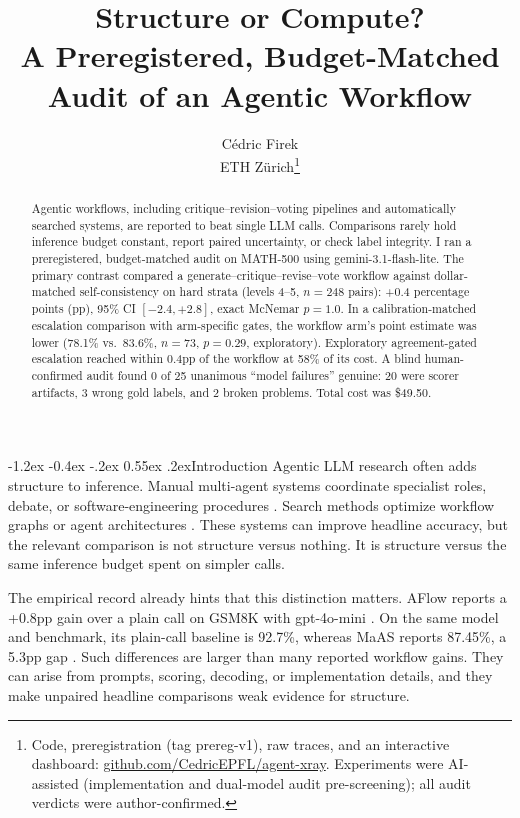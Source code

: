 \documentclass[twocolumn,10pt]{article}
\title{\vspace{-1.2em}Structure or Compute?\\
A Preregistered, Budget-Matched Audit of an Agentic Workflow}
\author{C\'edric Firek\\ETH Z\"urich\thanks{Code, preregistration (tag prereg-v1), raw traces, and an interactive dashboard: \url{github.com/CedricEPFL/agent-xray}. Experiments were AI-assisted (implementation and dual-model audit pre-screening); all audit verdicts were author-confirmed.}}
\date{}
\makeatletter
\renewcommand\section{\@startsection{section}{1}{\z@}%
  {-1.2ex \@plus -0.4ex \@minus -.2ex}%
  {0.55ex \@plus .2ex}{\normalfont\large\bfseries}}
\makeatother
\begin{document}
\maketitle

\begin{abstract}
Agentic workflows, including critique--revision--voting pipelines and automatically searched systems, are reported to beat single LLM calls. Comparisons rarely hold inference budget constant, report paired uncertainty, or check label integrity. I ran a preregistered, budget-matched audit on MATH-500 using gemini-3.1-flash-lite. The primary contrast compared a generate--critique--revise--vote workflow against dollar-matched self-consistency on hard strata (levels 4--5, $n=248$ pairs): +0.4 percentage points (pp), 95\% CI $[-2.4,+2.8]$, exact McNemar $p=1.0$. In a calibration-matched escalation comparison with arm-specific gates, the workflow arm's point estimate was lower (78.1\% vs.\ 83.6\%, $n=73$, $p=0.29$, exploratory). Exploratory agreement-gated escalation reached within 0.4pp of the workflow at 58\% of its cost. A blind human-confirmed audit found 0 of 25 unanimous ``model failures'' genuine: 20 were scorer artifacts, 3 wrong gold labels, and 2 broken problems. Total cost was \$49.50.
\end{abstract}

\section{Introduction}
Agentic LLM research often adds structure to inference. Manual multi-agent systems coordinate specialist roles, debate, or software-engineering procedures \citep{wu2023autogen,hong2024metagpt}. Search methods optimize workflow graphs or agent architectures \citep{hu2025adas,zhang2025aflow,zhuge2024gptswarm,zhang2025maas}. These systems can improve headline accuracy, but the relevant comparison is not structure versus nothing. It is structure versus the same inference budget spent on simpler calls.

The empirical record already hints that this distinction matters. AFlow reports a +0.8pp gain over a plain call on GSM8K with gpt-4o-mini \citep{zhang2025aflow}. On the same model and benchmark, its plain-call baseline is 92.7\%, whereas MaAS reports 87.45\%, a 5.3pp gap \citep{zhang2025maas}. Such differences are larger than many reported workflow gains. They can arise from prompts, scoring, decoding, or implementation details, and they make unpaired headline comparisons weak evidence for structure.
\end{document}
